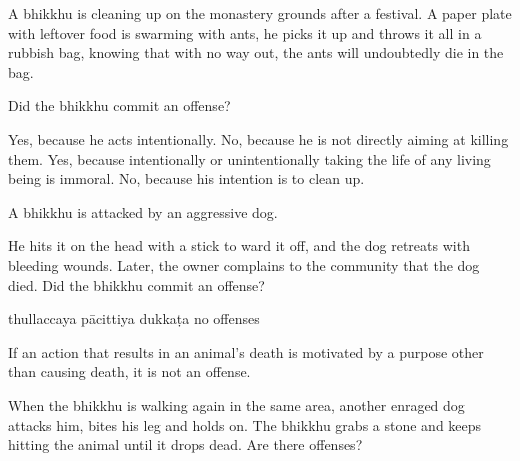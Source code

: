 \begin{exam}{\autoExamName}
\begin{problem}

  A bhikkhu is cleaning up on the monastery grounds after a festival.
  A paper plate with leftover food is swarming with ants, he picks it up and throws it all in a rubbish bag,
  knowing that with no way out, the ants will undoubtedly die in the bag.

  Did the bhikkhu commit an offense?

\bigskip

\begin{manswers}{1}
    \bChoices
     Yes, because he acts intentionally. \eAns
     No, because he is not directly aiming at killing them. \eAns
     Yes, because intentionally or unintentionally taking the life of any living being is immoral. \eAns
     No, because his intention is to clean up. \eAns
    \eChoices
\end{manswers}

\end{problem}

\problemDivide

\begin{problem*}

  A bhikkhu is attacked by an aggressive dog.

  \begin{parts}

    \item He hits it on the head with a stick to ward it off, and the dog retreats with bleeding wounds. Later, the owner complains to the community that the dog died. Did the bhikkhu commit an offense?

    \bigskip

    \begin{answers}{4}
      \bChoices
       thullaccaya \eAns
       pācittiya\eAns
       dukkaṭa\eAns
       no offenses\eAns
      \eChoices
    \end{answers}

    \begin{solution}
      If an action that results in an animal's death is motivated by a purpose other than causing death, it is not an offense.
    \end{solution}

    \bigskip

    \item When the bhikkhu is walking again in the same area, another enraged dog attacks him, bites his leg and holds on. The bhikkhu grabs a stone and keeps hitting the animal until it drops dead. Are there offenses?


\end{parts}
\end{problem*}
\end{exam}
